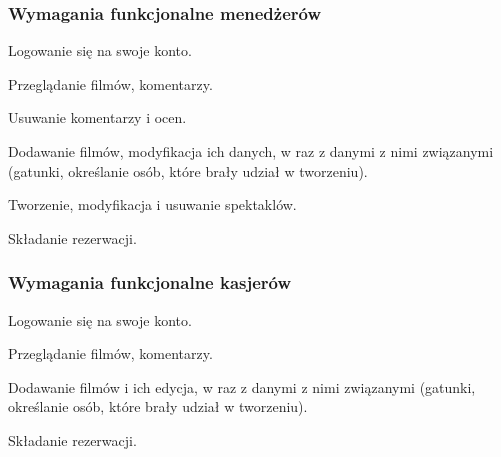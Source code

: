 \subsubsection*{Wymagania funkcjonalne menedżerów}
\begin{description}[style=nextline]
	\item[] Logowanie się na swoje konto.
	\item[] Przeglądanie filmów, komentarzy.
	\item[] Usuwanie komentarzy i ocen.
	\item[] Dodawanie filmów, modyfikacja ich danych, w raz z danymi z nimi związanymi (gatunki, określanie osób, które brały udział w tworzeniu).
	\item[] Tworzenie, modyfikacja i usuwanie spektaklów.
	\item[] Składanie rezerwacji.
\end{description}

\subsubsection*{Wymagania funkcjonalne kasjerów}
\begin{description}[style=nextline]
	\item[] Logowanie się na swoje konto.
	\item[] Przeglądanie filmów, komentarzy.
	\item[] Dodawanie filmów i ich edycja, w raz z danymi z nimi związanymi (gatunki, określanie osób, które brały udział w tworzeniu).
	\item[] Składanie rezerwacji.
\end{description}


